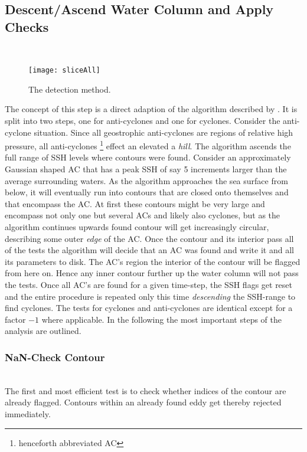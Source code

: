 \subsection*{Descent/Ascend Water Column and Apply Checks}
 \\
\begin{figure}
	\texttt{[image: sliceAll]}
	\caption{The detection method.}
	\label{fig:sliceAll}
\end{figure}
The concept of this step is a direct adaption of the algorithm described
by \cite{Chelton2011}. It is split into two steps, one for anti-cyclones and one
for cyclones. Consider \eg the anti-cyclone situation. Since all
geostrophic anti-cyclones are regions of relative high pressure, all
anti-cyclones \footnote{henceforth abbreviated AC} effect an elevated \SSH \ie
a \textit{hill}. The algorithm ascends the full range of SSH levels where
contours were found. Consider an approximately Gaussian shaped AC that has a
peak SSH of say 5 increments larger than the average surrounding waters.
As the algorithm approaches the sea surface from below, it will eventually run
into contours that are closed onto themselves and that encompass the AC. At
first these contours might be very large and encompass not only one but several
ACs and likely also cyclones, but as the algorithm continues upwards found
contour will get increasingly circular, describing some outer \textit{edge} of
the AC. Once the contour and its interior pass all of the tests the algorithm
will decide that an AC was found and write it and all its parameters to disk.
The AC's region \ie the interior of the contour will be flagged from here on.
Hence any inner contour further up the water column will not pass the tests.
Once all AC's are found for a given time-step, the SSH flags get reset and the
entire procedure is repeated only this time \textit{descending} the SSH-range to
find cyclones. The tests for cyclones and anti-cyclones are identical except for
a factor $-1$ where applicable. In the following the most important steps of the
analysis are
outlined.
\subsubsection{NaN-Check Contour}
\\
The first and most efficient test is to check whether indices of the
contour are already flagged. Contours within an already found eddy get thereby
rejected immediately.
